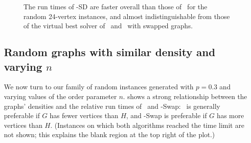 \begin{figure}[h!]
    \centering
    \caption{The run times of \McSplit-SD are faster overall than those of \McSplit\ for the
        random 24-vertex instances, and almost indistinguishable from those of the virtual
        best solver of \McSplit\ and \McSplit\ with swapped graphs.}
        \label{figure:left-vs-smart-d-mcis}
\end{figure}

\subsection{Random graphs with similar density and varying $n$}

We now turn to our family of random instances generated with $p=0.3$ and varying values of
the order parameter $n$.   shows a strong relationship between
the graphs' densities and the relative run times of \McSplit\ and \McSplit-Swap: \McSplit\
is generally preferable if $G$ has fewer vertices than $H$, and \McSplit-Swap is preferable
if $G$ has more vertices than $H$.  (Instances on which both algorithms reached the time limit
are not shown; this explains the blank region at the top right of the plot.)

